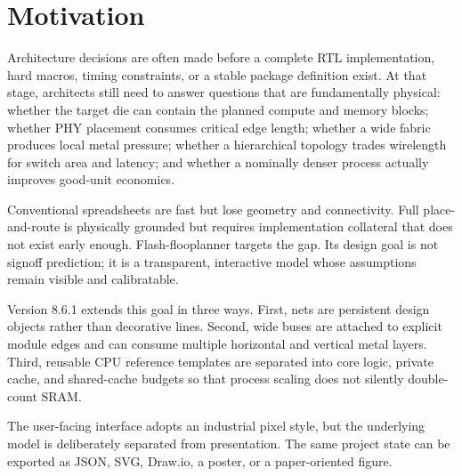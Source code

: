 \section{Motivation}
Architecture decisions are often made before a complete RTL implementation, hard macros, timing constraints, or a stable package definition exist. At that stage, architects still need to answer questions that are fundamentally physical: whether the target die can contain the planned compute and memory blocks; whether PHY placement consumes critical edge length; whether a wide fabric produces local metal pressure; whether a hierarchical topology trades wirelength for switch area and latency; and whether a nominally denser process actually improves good-unit economics.

Conventional spreadsheets are fast but lose geometry and connectivity. Full place-and-route is physically grounded but requires implementation collateral that does not exist early enough. Flash-flooplanner targets the gap. Its design goal is not signoff prediction; it is a transparent, interactive model whose assumptions remain visible and calibratable.

Version 8.6.1 extends this goal in three ways. First, nets are persistent design objects rather than decorative lines. Second, wide buses are attached to explicit module edges and can consume multiple horizontal and vertical metal layers. Third, reusable CPU reference templates are separated into core logic, private cache, and shared-cache budgets so that process scaling does not silently double-count SRAM.

The user-facing interface adopts an industrial pixel style, but the underlying model is deliberately separated from presentation. The same project state can be exported as JSON, SVG, Draw.io, a poster, or a paper-oriented figure.

